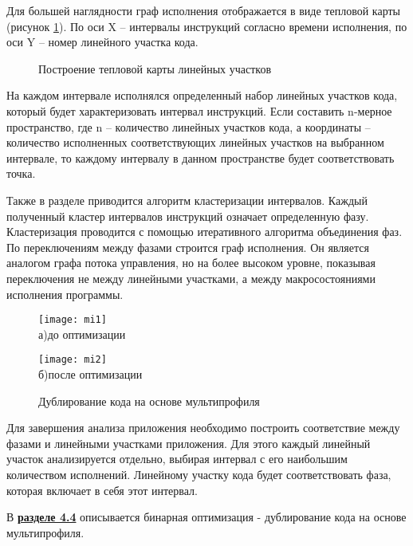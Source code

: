 Для большей наглядности граф исполнения отображается в виде тепловой карты (рисунок \cref{fig:HeatMap}). По оси X – интервалы инструкций согласно времени исполнения, по оси Y – номер линейного участка кода.

\begin{figure}[!h]
    \centerfloat{
        \texttt{[image: \_9]}
    }
    \caption{Построение тепловой карты линейных участков}\label{fig:HeatMap}
\end{figure}

На каждом интервале исполнялся определенный набор линейных участков кода, который будет характеризовать интервал инструкций. Если составить n-мерное пространство, где n – количество линейных участков кода, а координаты – количество исполненных соответствующих линейных участков на выбранном интервале, то каждому интервалу в данном пространстве будет соответствовать точка.

Также в разделе приводится алгоритм кластеризации интервалов. Каждый полученный кластер интервалов инструкций означает определенную фазу. Кластеризация проводится с помощью итеративного алгоритма объединения фаз. По переключениям между фазами строится граф исполнения. Он является аналогом графа потока управления, но на более высоком уровне, показывая переключения не между линейными участками, а между макросостояниями исполнения программы.

\begin{figure}[H]
    \begin{minipage}[b][][b]{1.0\linewidth}\centering
        \texttt{[image: mi1]} \\ а)до оптимизации
    \end{minipage}
    \vfill
    \begin{minipage}[b][][b]{1.0\linewidth}\centering
        \texttt{[image: mi2]} \\ б)после оптимизации
    \end{minipage}
    \caption{Дублирование кода на основе мультипрофиля}
    \label{fig:MultiProfileOpt}
\end{figure}

Для завершения анализа приложения необходимо построить соответствие между фазами и линейными участками приложения. Для этого каждый линейный участок анализируется отдельно, выбирая интервал с его наибольшим количеством исполнений. Линейному участку кода будет соответствовать фаза, которая включает в себя этот интервал.

В \underline{\textbf{разделе 4.4}} описывается бинарная оптимизация - дублирование кода на основе мультипрофиля.

